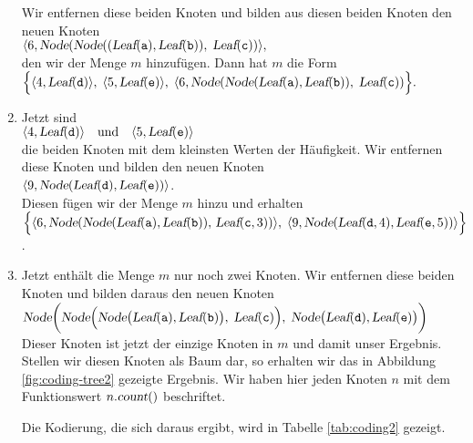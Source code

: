 \begin{enumerate}
      Wir entfernen diese beiden Knoten und bilden aus diesen beiden Knoten den neuen Knoten
      \\[0.2cm]
      \hspace*{0.3cm}
      $ \langle 6, \textsl{Node}(
           \textsl{Node}((\textsl{Leaf}(\mathtt{a}), \textsl{Leaf}(\mathtt{b})),\; 
           \textsl{Leaf}(\mathtt{c}))\rangle, $
      \\[0.2cm]
      den wir der Menge $m$ hinzuf\"ugen.  Dann hat $m$ die Form
      \\[0.2cm]
      \hspace*{0.3cm}
      $ \Bigl\{ 
        \langle 4, \textsl{Leaf}(\mathtt{d}) \rangle,\;\langle 5, \textsl{Leaf}(\mathtt{e}) \rangle,\;
        \langle 6, \textsl{Node}(
           \textsl{Node}(\textsl{Leaf}(\mathtt{a}), \textsl{Leaf}(\mathtt{b})),\; 
           \textsl{Leaf}(\mathtt{c}))\Bigr\}. $
\item Jetzt sind 
      \\[0.2cm]
      \hspace*{0.3cm}
      $ \langle 4, \textsl{Leaf}(\mathtt{d}) \rangle \quad \mathrm{und} \quad \langle 5, \textsl{Leaf}(\mathtt{e}) \rangle$
      \\[0.2cm]
      die beiden Knoten mit dem kleinsten Werten der H\"aufigkeit.
      Wir entfernen diese Knoten und bilden den neuen Knoten \\[0.2cm]
      \hspace*{0.3cm}
      $\langle 9, \textsl{Node}(\textsl{Leaf}(\mathtt{d}), \textsl{Leaf}(\mathtt{e})) \rangle$.
      \\[0.2cm]
      Diesen f\"ugen wir der Menge $m$ hinzu und erhalten
      \\[0.2cm]
      \hspace*{0.3cm}
      $ \Bigl\{ 
        \langle 6, \textsl{Node}(
           \textsl{Node}(\textsl{Leaf}(\mathtt{a}),
           \textsl{Leaf}(\mathtt{b})),\,\textsl{Leaf}(\mathtt{c},3))
        \rangle,\;
        \langle 9,\textsl{Node}(\textsl{Leaf}(\mathtt{d},4), \textsl{Leaf}(\mathtt{e},5)) \rangle
        \Bigr\}
           $.      
\item Jetzt enth\"alt die Menge $m$ nur noch zwei Knoten.  Wir entfernen diese beiden Knoten und
      bilden daraus den neuen Knoten
      \\[0.2cm]
      \hspace*{0.3cm}
      $\textsl{Node}\biggl(
              \textsl{Node}\Bigl(
                 \textsl{Node}\bigl(\textsl{Leaf}(\mathtt{a}), \textsl{Leaf}(\mathtt{b})\bigr),\; 
                 \textsl{Leaf}(\mathtt{c})\Bigr),\;
              \textsl{Node}\bigl(\textsl{Leaf}(\mathtt{d}), \textsl{Leaf}(\mathtt{e})\bigr)
         \biggr)
      $
      \\[0.2cm]
      Dieser Knoten ist jetzt der einzige Knoten in $m$ und damit unser Ergebnis.
      Stellen wir diesen Knoten als Baum dar, so erhalten wir das in Abbildung
      \ref{fig:coding-tree2} gezeigte Ergebnis.  Wir haben hier jeden Knoten $n$
      mit dem Funktionswert  $n.\textsl{count}()$ beschriftet.  

      Die Kodierung, die sich daraus ergibt,
      wird in Tabelle \ref{tab:coding2} gezeigt.
\end{enumerate}

